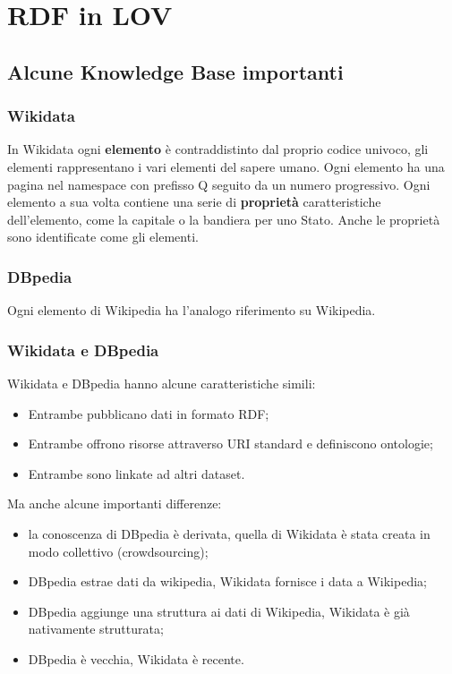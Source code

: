 \section{RDF in LOV}

\subsection{Alcune Knowledge Base importanti}
\subsubsection{Wikidata}
In Wikidata ogni \textbf{elemento} è contraddistinto dal proprio codice univoco, gli elementi rappresentano i vari elementi del sapere umano. Ogni elemento ha una pagina nel namespace con prefisso Q seguito da un numero progressivo. Ogni elemento a sua volta contiene una serie di \textbf{proprietà} caratteristiche dell'elemento, come la capitale o la bandiera per uno Stato. Anche le proprietà sono identificate come gli elementi.

\subsubsection{DBpedia}
Ogni elemento di Wikipedia ha l'analogo riferimento su Wikipedia.

\subsubsection{Wikidata e DBpedia}
Wikidata e DBpedia hanno alcune caratteristiche simili:
\begin{itemize}
	\item Entrambe pubblicano dati in formato RDF;
	\item Entrambe offrono risorse attraverso URI standard e definiscono ontologie;
	\item Entrambe sono linkate ad altri dataset.
\end{itemize}
Ma anche alcune importanti differenze:
\begin{itemize}
	\item la conoscenza di DBpedia è derivata, quella di Wikidata è stata creata in modo collettivo (crowdsourcing);
	\item DBpedia estrae dati da wikipedia, Wikidata fornisce i data a Wikipedia;
	\item DBpedia aggiunge una struttura ai dati di Wikipedia, Wikidata è già nativamente strutturata;
	\item DBpedia è vecchia, Wikidata è recente.
\end{itemize}

